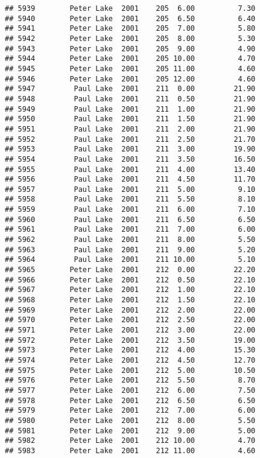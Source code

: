 \documentclass[
]{article}
\begin{document}
\begin{verbatim}
## 5939        Peter Lake  2001    205  6.00          7.30
## 5940        Peter Lake  2001    205  6.50          6.40
## 5941        Peter Lake  2001    205  7.00          5.80
## 5942        Peter Lake  2001    205  8.00          5.30
## 5943        Peter Lake  2001    205  9.00          4.90
## 5944        Peter Lake  2001    205 10.00          4.70
## 5945        Peter Lake  2001    205 11.00          4.60
## 5946        Peter Lake  2001    205 12.00          4.60
## 5947         Paul Lake  2001    211  0.00         21.90
## 5948         Paul Lake  2001    211  0.50         21.90
## 5949         Paul Lake  2001    211  1.00         21.90
## 5950         Paul Lake  2001    211  1.50         21.90
## 5951         Paul Lake  2001    211  2.00         21.90
## 5952         Paul Lake  2001    211  2.50         21.70
## 5953         Paul Lake  2001    211  3.00         19.90
## 5954         Paul Lake  2001    211  3.50         16.50
## 5955         Paul Lake  2001    211  4.00         13.40
## 5956         Paul Lake  2001    211  4.50         11.70
## 5957         Paul Lake  2001    211  5.00          9.10
## 5958         Paul Lake  2001    211  5.50          8.10
## 5959         Paul Lake  2001    211  6.00          7.10
## 5960         Paul Lake  2001    211  6.50          6.50
## 5961         Paul Lake  2001    211  7.00          6.00
## 5962         Paul Lake  2001    211  8.00          5.50
## 5963         Paul Lake  2001    211  9.00          5.20
## 5964         Paul Lake  2001    211 10.00          5.10
## 5965        Peter Lake  2001    212  0.00         22.20
## 5966        Peter Lake  2001    212  0.50         22.10
## 5967        Peter Lake  2001    212  1.00         22.10
## 5968        Peter Lake  2001    212  1.50         22.10
## 5969        Peter Lake  2001    212  2.00         22.00
## 5970        Peter Lake  2001    212  2.50         22.00
## 5971        Peter Lake  2001    212  3.00         22.00
## 5972        Peter Lake  2001    212  3.50         19.00
## 5973        Peter Lake  2001    212  4.00         15.30
## 5974        Peter Lake  2001    212  4.50         12.70
## 5975        Peter Lake  2001    212  5.00         10.50
## 5976        Peter Lake  2001    212  5.50          8.70
## 5977        Peter Lake  2001    212  6.00          7.50
## 5978        Peter Lake  2001    212  6.50          6.50
## 5979        Peter Lake  2001    212  7.00          6.00
## 5980        Peter Lake  2001    212  8.00          5.50
## 5981        Peter Lake  2001    212  9.00          5.00
## 5982        Peter Lake  2001    212 10.00          4.70
## 5983        Peter Lake  2001    212 11.00          4.60

\end{verbatim}
\end{document}
